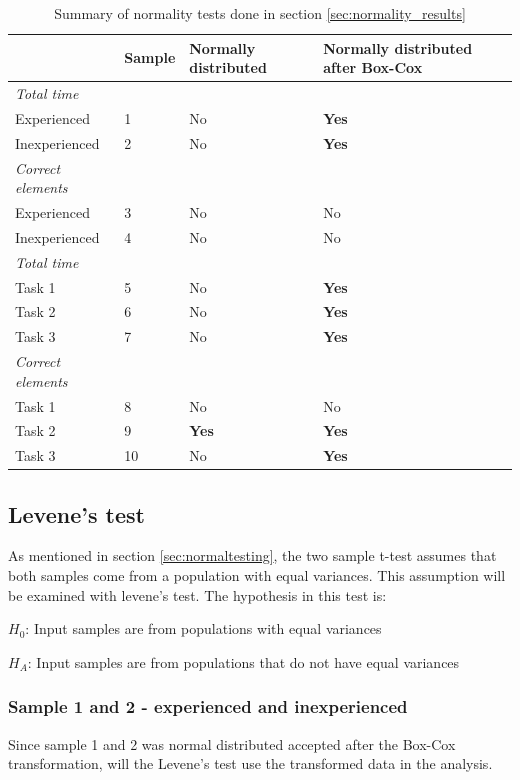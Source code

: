 \begin{table}[H]
	\centering
	\begin{tabular}{l|l|l|l}
		  & Sample & Normally distributed  & Normally distributed after Box-Cox  \\ \hline
		\textit{Total time} & & & \\
		Experienced & 1 &No   & \textbf{Yes}   \\
		Inexperienced  & 2 & No & \textbf{Yes}     \\ \hline
		\textit{Correct elements} & & & \\
		Experienced & 3 & No  & No   \\
		Inexperienced  & 4 & No & No   \\ \hline
		\textit{Total time }& & & \\
		Task 1 & 5 &No  & \textbf{Yes}  \\
		Task 2 & 6 &No  & \textbf{Yes}   \\
		Task 3 & 7 & No & \textbf{Yes}  \\ \hline
		\textit{Correct elements} & & & \\
		Task 1 & 8 & No  & No  \\
		Task 2 & 9 &\textbf{Yes}  & \textbf{Yes}   \\
		Task 3 & 10 & No & \textbf{Yes}  \\ \hline
	\end{tabular}
	\caption[Summary, normality tests]{Summary of normality tests done in section \ref{sec:normality_results}}
	\label{tab:normaltest_summary}
\end{table}

\subsection{Levene's test}
As mentioned in section \ref{sec:normaltesting}, the two sample t-test assumes that both samples come from a population with equal variances. This assumption will be examined with levene's test. The hypothesis in this test is: 

\centerline{$H_{0}$: Input samples are from populations with equal variances} 
\centerline{$H_{A}$: Input samples are from populations that do not have equal variances}

\subsubsection[Sample 1 and 2]{Sample 1 and 2 - experienced and inexperienced}
Since sample 1 and 2 was normal distributed accepted after the Box-Cox transformation, will the Levene's test use the transformed data in the analysis. 



